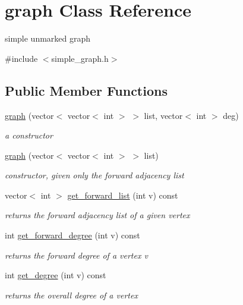 \hypertarget{classgraph}{}\section{graph Class Reference}
\label{classgraph}


simple unmarked graph  




{\ttfamily \#include $<$simple\+\_\+graph.\+h$>$}

\subsection*{Public Member Functions}
\begin{DoxyCompactItemize}
\item 
\hyperlink{classgraph_a0f89acfea28c8996a0d8df4d07e6ecf2}{graph} (vector$<$ vector$<$ int $>$ $>$ list, vector$<$ int $>$ deg)
\begin{DoxyCompactList}\small\item\em a constructor \end{DoxyCompactList}\item 
\hyperlink{classgraph_afad830c445cfc831ee37eb755170a4a7}{graph} (vector$<$ vector$<$ int $>$ $>$ list)
\begin{DoxyCompactList}\small\item\em constructor, given only the forward adjacency list \end{DoxyCompactList}\item 
vector$<$ int $>$ \hyperlink{classgraph_aa8fbee52a7b3604dbbd9175040c7ead5}{get\+\_\+forward\+\_\+list} (int v) const
\begin{DoxyCompactList}\small\item\em returns the forward adjacency list of a given vertex \end{DoxyCompactList}\item 
int \hyperlink{classgraph_a388b6ce292a4c49e3853e22bdce978de}{get\+\_\+forward\+\_\+degree} (int v) const
\begin{DoxyCompactList}\small\item\em returns the forward degree of a vertex v \end{DoxyCompactList}\item 
int \hyperlink{classgraph_a593245054bf5ded344fbf304bcdc7fbe}{get\+\_\+degree} (int v) const
\begin{DoxyCompactList}\small\item\em returns the overall degree of a vertex \end{DoxyCompactList}\item 

\end{DoxyCompactItemize}
